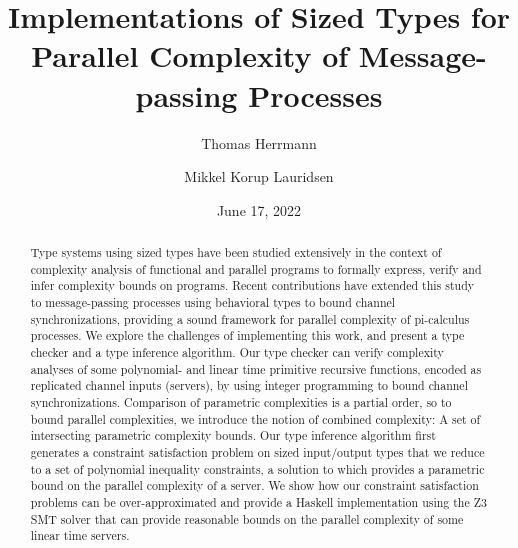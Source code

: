 \documentclass[11pt,a4paper,oldfontcommands]{memoir}
\title{Implementations of Sized Types for Parallel Complexity of Message-passing Processes}
\author{Thomas Herrmann}
\author{Mikkel Korup Lauridsen}
\affil{\{therrm17,mkla17\}@student.aau.dk}
\affil{Department of Computer Science, Aalborg University}
\affil{Aalborg, Denmark}
\date{June 17, 2022}
\theoremstyle{proposition}
\theoremstyle{proposition}
\theoremstyle{definition}
\theoremstyle{plain}
\theoremstyle{remark}
\theoremstyle{definition}
\begin{document}

\maketitle

\begin{abstract}
    Type systems using sized types have been studied extensively in the context of complexity analysis of functional and parallel programs to formally express, verify and infer complexity bounds on programs. Recent contributions have extended this study to message-passing processes using behavioral types to bound channel synchronizations, providing a sound framework for parallel complexity of pi-calculus processes. We explore the challenges of implementing this work, and present a type checker and a type inference algorithm. Our type checker can verify complexity analyses of some polynomial- and linear time primitive recursive functions, encoded as replicated channel inputs (servers), by using integer programming to bound channel synchronizations. Comparison of parametric complexities is a partial order, so to bound parallel complexities, we introduce the notion of combined complexity: A set of intersecting parametric complexity bounds. Our type inference algorithm first generates a constraint satisfaction problem on sized input/output types that we reduce to a set of polynomial inequality constraints, a solution to which provides a parametric bound on the parallel complexity of a server. We show how our constraint satisfaction problems can be over-approximated and provide a Haskell implementation using the Z3 SMT solver that can provide reasonable bounds on the parallel complexity of some linear time servers.
\end{abstract}
\clearpage
\end{document}
